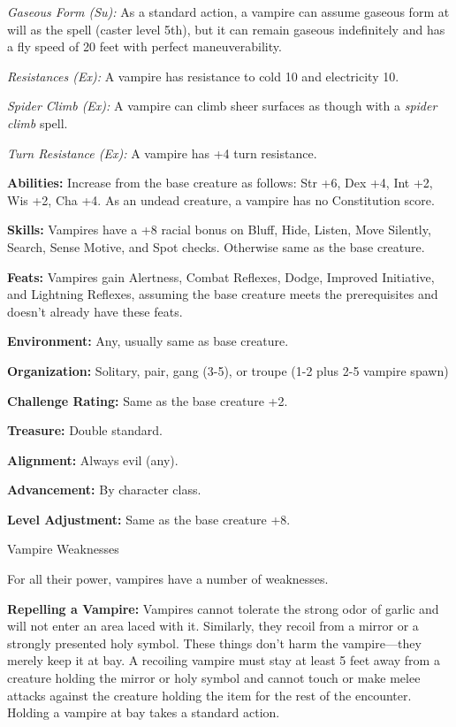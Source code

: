 \documentclass{article}
\begin{document}
\textit{Gaseous Form (Su): }As a standard action, a vampire can assume gaseous 
form at will as the spell (caster level 5th), but it can remain gaseous indefinitely 
and has a fly speed of 20 feet with perfect maneuverability.

\textit{Resistances (Ex): }A vampire has resistance to cold 10 and electricity 
10.

\textit{Spider Climb (Ex): }A vampire can climb sheer surfaces as though with a 
\textit{spider climb }spell.

\textit{Turn Resistance (Ex): }A vampire has +4 turn resistance. 

\textbf{Abilities:} Increase from the base creature as follows: Str +6, Dex +4, 
Int +2, Wis +2, Cha +4. As an undead creature, a vampire has no Constitution score.

\textbf{Skills:} Vampires have a +8 racial bonus on Bluff, Hide, Listen, Move Silently, 
Search, Sense Motive, and Spot checks. Otherwise same as the base creature.

\textbf{Feats: }Vampires gain Alertness, Combat Reflexes, Dodge, Improved Initiative, 
and Lightning Reflexes, assuming the base creature meets the prerequisites and 
doesn't already have these feats.

\textbf{Environment:} Any, usually same as base creature.

\textbf{Organization:} Solitary, pair, gang (3-5), or troupe (1-2 plus 2-5 vampire 
spawn)

\textbf{Challenge Rating:} Same as the base creature +2.

\textbf{Treasure: }Double standard.

\textbf{Alignment: }Always evil (any).

\textbf{Advancement:} By character class.

\textbf{Level Adjustment:} Same as the base creature +8.

\vspace{12pt}
Vampire Weaknesses

For all their power, vampires have a number of weaknesses.

\textbf{Repelling a Vampire:} Vampires cannot tolerate the strong odor of garlic 
and will not enter an area laced with it. Similarly, they recoil from a mirror 
or a strongly presented holy symbol. These things don't harm the vampire---they 
merely keep it at bay. A recoiling vampire must stay at least 5 feet away from 
a creature holding the mirror or holy symbol and cannot touch or make melee attacks 
against the creature holding the item for the rest of the encounter. Holding a 
vampire at bay takes a standard action.
\end{document}
